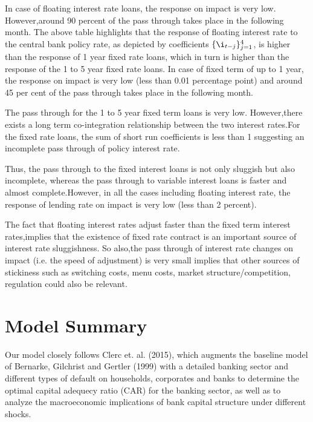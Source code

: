 \documentclass[12pt]{article}
\numberwithin{equation}{section}
\begin{document}
In case of floating interest rate loans, the response on impact is very low. However,around 90 percent of the pass through takes place in the following month. The above table highlights that the response of floating interest rate to the central bank policy rate, as depicted by coefficients $\{ \i_{t-j} \}_{j=1}^{4}  $,  is higher than the response of 1 year fixed rate loans, which in turn is higher than the response of the 1 to 5 year fixed rate loans.  In case of fixed term of up to 1 year, the response on impact is very low (less than 0.01 percentage point) and around 45 per cent of the pass through takes place in the following month. 


The pass through for the 1 to 5 year fixed term loans is very low. However,there exists a long term co-integration relationship between the two interest rates.For the fixed rate loans, the sum of short run coefficients is less than 1 suggesting an incomplete pass through of policy interest rate.

Thus, the pass through to the fixed interest loans is not only sluggish but also incomplete, whereas the pass through to variable interest loans is faster and almost complete.However, in all the cases including floating interest rate, the response of lending rate on impact is very low (less than 2 percent).

The fact that  floating interest rates adjust faster than the fixed term interest rates,implies that the existence of fixed rate contract is an important source of interest rate sluggishness. So also,the pass through of interest rate changes on impact (i.e. the speed of adjustment) is very small implies that other sources of stickiness such as switching costs, menu costs, market structure/competition, regulation could also be relevant.



 
\section{Model Summary}
Our model closely follows Clerc et. al. (2015), which augments the baseline model of Bernarke, Gilchrist and Gertler (1999) with a detailed banking sector and different types of default on households, corporates and banks to determine the optimal capital adequecy ratio (CAR) for the banking sector, as well as to analyze the macroeconomic implications of bank capital structure under different shocks. 
\end{document}
